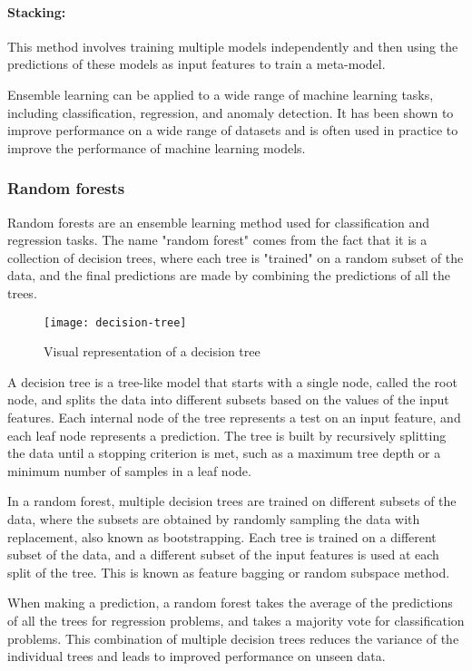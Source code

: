 \paragraph{Stacking:} This method involves training multiple models independently and then using the predictions of these models as input features to train a meta-model.

Ensemble learning can be applied to a wide range of machine learning tasks, including classification, regression, and anomaly detection. It has been shown to improve performance on a wide range of datasets and is often used in practice to improve the performance of machine learning models.


\subsubsection{Random forests}

Random forests are an ensemble learning method used for classification and regression tasks. The name "random forest" comes from the fact that it is a collection of decision trees, where each tree is "trained" on a random subset of the data, and the final predictions are made by combining the predictions of all the trees.

\begin{figure}[ht]
  \centering
  \texttt{[image: decision-tree]}
  \caption{Visual representation of a decision tree \cite{scikit}}
\end{figure}

A decision tree is a tree-like model that starts with a single node, called the root node, and splits the data into different subsets based on the values of the input features. Each internal node of the tree represents a test on an input feature, and each leaf node represents a prediction. The tree is built by recursively splitting the data until a stopping criterion is met, such as a maximum tree depth or a minimum number of samples in a leaf node.

In a random forest, multiple decision trees are trained on different subsets of the data, where the subsets are obtained by randomly sampling the data with replacement, also known as bootstrapping. Each tree is trained on a different subset of the data, and a different subset of the input features is used at each split of the tree. This is known as feature bagging or random subspace method.

When making a prediction, a random forest takes the average of the predictions of all the trees for regression problems, and takes a majority vote for classification problems. This combination of multiple decision trees reduces the variance of the individual trees and leads to improved performance on unseen data.

